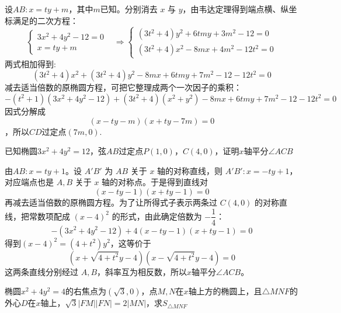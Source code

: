\begin{solution}
    设$AB:x=ty+m$，其中$m$已知。分别消去 $x$ 与 $y$，由韦达定理得到端点横、纵坐标满足的二次方程：
    \[\begin{cases}3x^{2}+4y^{2}-12=0\\x=ty+m&\end{cases}\Rightarrow\begin{cases}(3t^{2}+4)y^{2}+6tmy+3m^{2}-12=0\\(3t^{2}+4)x^{2}-8mx+4m^{2}-12t^{2}=0\end{cases}\]
    两式相加得到:\[(3t^2+4)x^2+(3t^2+4)y^2-8mx+6tmy+7m^2-12-12t^2=0\]
    减去适当倍数的原椭圆方程，可把它整理成两个一次因子的乘积：
    \[-(t^2+1)(3x^{2}+4y^{2}-12)+(3t^{2}+4)(x^{2}+y^{2})-8mx+6tmy+7m^{2}-12-12t^{2}=0\]
    因式分解成\[(x-ty-m)(x+ty-7m)=0\]，所以$CD$过定点$(7m,0)$.
\end{solution}
\begin{example}[（角平分线）]
    已知椭圆$3x^2+4y^2=12$，弦$AB$过定点$P(1,0)$，$C(4,0)$，证明$x$轴平分$\angle{ACB}$
\end{example}
\begin{solution}
    由$AB:x=ty+1$。设 $A'B'$ 为 $AB$ 关于 $x$ 轴的对称直线，则 $A'B':x=-ty+1$，对应端点也是 $A,B$ 关于 $x$ 轴的对称点。于是得到直线对
    \[(x-ty-1)(x+ty-1)=0\]
    再减去适当倍数的原椭圆方程。为了让所得式子表示两条过 $C(4,0)$ 的对称直线，把常数项配成 $(x-4)^2$ 的形式，由此确定倍数为 $-\dfrac14$：
    \[-(3x^{2}+4y^{2}-12)+4(x-ty-1)(x+ty-1)=0\]
    得到$(x-4)^2=(4+t^2)y^2$，这等价于\[(x+\sqrt{4+t^2}y-4)(x-\sqrt{4+t^2}y-4)=0\]
    这两条直线分别经过 $A,B$，斜率互为相反数，所以$x$轴平分$\angle ACB$。
\end{solution}
\newpage
\begin{example}[（焦点、外心与面积）]
    椭圆$x^2+4y^2=4$的右焦点为$(\sqrt3,0)$，点$M,N$在$x$轴上方的椭圆上，且$\triangle{MNF}$的外心$D$在$x$轴上，$\sqrt{3}|FM||FN|=2|MN|$，求$S_{\triangle{MNF}}$
\end{example}
